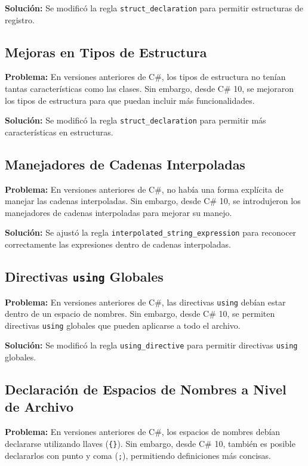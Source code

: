 \textbf{Solución:} Se modificó la regla \texttt{struct\_declaration} para permitir estructuras de registro.

\subsection{Mejoras en Tipos de Estructura}
\textbf{Problema:} En versiones anteriores de C\#, los tipos de estructura no tenían tantas características como las clases. Sin embargo, desde C\# 10, se mejoraron los tipos de estructura para que puedan incluir más funcionalidades.

\textbf{Solución:} Se modificó la regla \texttt{struct\_declaration} para permitir más características en estructuras.

\subsection{Manejadores de Cadenas Interpoladas}
\textbf{Problema:} En versiones anteriores de C\#, no había una forma explícita de manejar las cadenas interpoladas. Sin embargo, desde C\# 10, se introdujeron los manejadores de cadenas interpoladas para mejorar su manejo.

\textbf{Solución:} Se ajustó la regla \texttt{interpolated\_string\_expression} para reconocer correctamente las expresiones dentro de cadenas interpoladas.

\subsection{Directivas \texttt{using} Globales}
\textbf{Problema:} En versiones anteriores de C\#, las directivas \texttt{using} debían estar dentro de un espacio de nombres. Sin embargo, desde C\# 10, se permiten directivas \texttt{using} globales que pueden aplicarse a todo el archivo.

\textbf{Solución:} Se modificó la regla \texttt{using\_directive} para permitir directivas \texttt{using} globales.

\subsection{Declaración de Espacios de Nombres a Nivel de Archivo}
\textbf{Problema:} En versiones anteriores de C\#, los espacios de nombres debían declararse utilizando llaves (\texttt{\{\}}). Sin embargo, desde C\# 10, también es posible declararlos con punto y coma (\texttt{;}), permitiendo definiciones más concisas.

